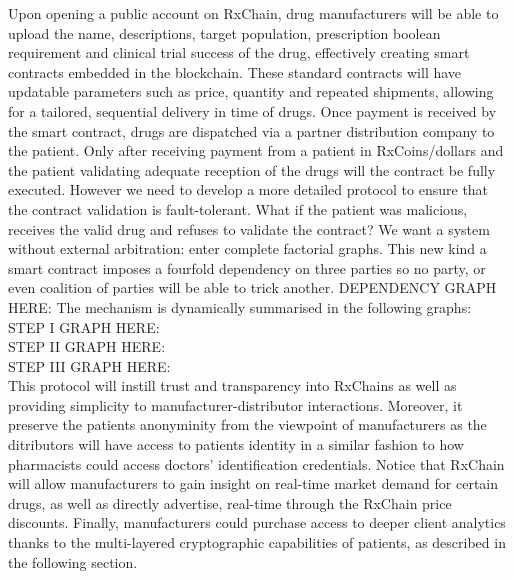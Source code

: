 
Upon opening a public account on RxChain, drug manufacturers will be
able to upload the name, descriptions, target population, prescription boolean
requirement and clinical trial success of the drug,
effectively creating smart contracts embedded in the blockchain. These
standard contracts will have updatable parameters such as price,
quantity and repeated shipments, allowing for a tailored, sequential
delivery in time of drugs.
Once payment is received by the smart contract, drugs are dispatched
via a partner distribution company to the patient. Only after
receiving payment from a patient in RxCoins/dollars and the patient
validating adequate reception of the drugs will the contract be fully
executed.
However we need to develop a more detailed protocol to ensure that the contract
validation is fault-tolerant. What if the patient was malicious,
receives the valid drug and refuses to validate the contract? We want
a system without external arbitration: enter complete factorial
graphs.
This new kind a smart contract imposes a fourfold dependency on three
parties so no party, or even coalition of parties will be able to
trick another.
DEPENDENCY GRAPH HERE:
The mechanism is dynamically summarised in the following graphs:\\
STEP I GRAPH HERE:\\
STEP II GRAPH HERE:\\
STEP III GRAPH HERE:\\

This protocol will instill trust and transparency into RxChains as well as providing
simplicity to manufacturer-distributor interactions. Moreover, it  preserve the
patients anonyminity from the viewpoint of manufacturers as the
ditributors will have access to patients identity in a similar fashion
to how pharmacists could access doctors' identification credentials.
Notice that RxChain  will allow manufacturers to gain insight on real-time
market demand for certain drugs,
as well as directly advertise, real-time through the RxChain price discounts. 
Finally, manufacturers could purchase access to deeper client
analytics thanks to the multi-layered cryptographic capabilities of
patients, as described in the following section.


